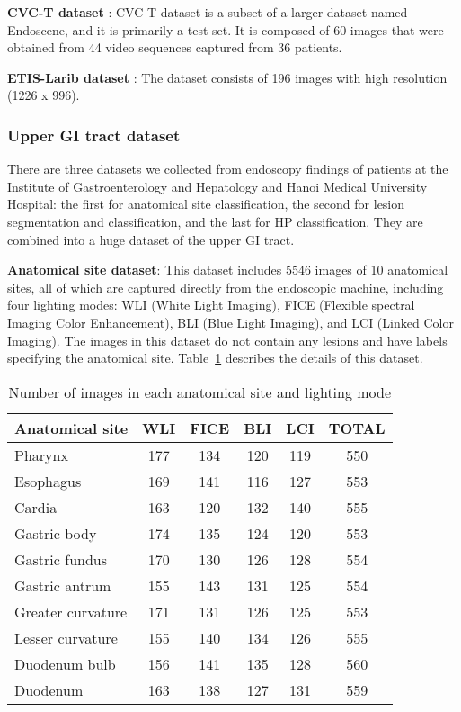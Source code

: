 \documentclass{article}
\begin{document}
\textbf{CVC-T dataset} \cite{Endo}:  CVC-T dataset is a subset of a larger dataset named Endoscene, and it is primarily a test set. It is composed of 60 images that were obtained from 44 video sequences captured from 36 patients.

\textbf{ETIS-Larib dataset} \cite{Etis}: The dataset consists of 196 images with high resolution (1226 x 996).



\subsubsection{Upper GI tract dataset}
There are three datasets we collected from endoscopy findings of patients at the Institute of Gastroenterology and Hepatology and Hanoi Medical University Hospital: the first for anatomical site classification, the second for lesion segmentation and classification, and the last for HP classification. They are combined into a huge dataset of the upper GI tract.

\textbf{Anatomical site dataset}: This dataset includes 5546 images of 10 anatomical sites, all of which are captured directly from the endoscopic machine, including four lighting modes: WLI (White Light Imaging), FICE (Flexible spectral Imaging Color Enhancement), BLI (Blue Light Imaging), and LCI (Linked Color Imaging). The images in this dataset do not contain any lesions and have labels specifying the anatomical site. Table~\ref{table:site dataset} describes the details of this dataset.

\begin{table}[h!]
\centering
\caption{Number of images in each anatomical site and lighting mode}
\begin{tabular}{l|c c c c c} 
\hline
Anatomical site & WLI & FICE & BLI & LCI & TOTAL\\ 
\hline
\hline
Pharynx  & 177 & 134 & 120 & 119 & 550 \\ 
Esophagus & 169 & 141 & 116 & 127 & 553 \\
Cardia & 163 & 120 & 132 & 140 & 555\\
Gastric body & 174 & 135 & 124 & 120 & 553\\
Gastric fundus & 170 & 130 & 126 & 128 & 554\\
Gastric antrum & 155 & 143 & 131 & 125 & 554\\  
Greater curvature & 171 & 131 & 126 & 125 & 553\\  
Lesser curvature & 155 & 140 & 134 & 126 & 555\\  
Duodenum bulb & 156 & 141 & 135 & 128 & 560\\  
Duodenum & 163 & 138 & 127 & 131 & 559\\  
\hline
\end{tabular}
\label{table:site dataset}
\end{table}
\end{document}
